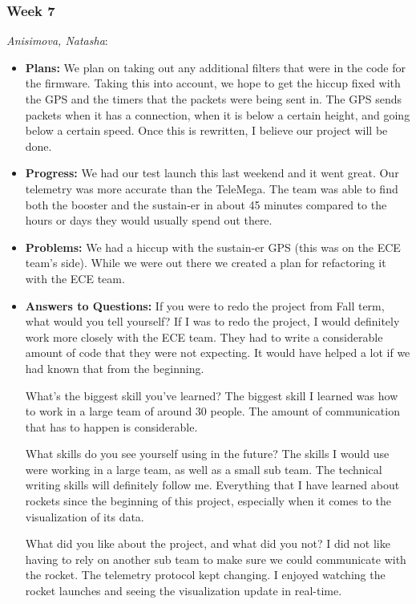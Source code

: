 \documentclass[10pt,draftclsnofoot,onecolumn]{IEEEtran}
\newcommand{\subsubsubsection}[1]{
	\hfill\break\textit{#1}:
}
\begin{document}
\subsubsection{Week 7}
\subsubsubsection{Anisimova, Natasha}
\begin{itemize}
	\item \textbf{Plans: }
We plan on taking out any additional filters that were in the code for the firmware. Taking this into account, we hope to get the hiccup fixed with the GPS and the timers that the packets were being sent in. The GPS sends packets when it has a connection, when it is below a certain height, and going below a certain speed. Once this is rewritten, I believe our project will be done.
	\item \textbf{Progress:  }
We had our test launch this last weekend and it went great. Our telemetry was more accurate than the TeleMega. The team was able to find both the booster and the sustain-er in about 45 minutes compared to the hours or days they would usually spend out there.
	\item \textbf{Problems: }
	We had a hiccup with the sustain-er GPS (this was on the ECE team's side). While we were out there we created a plan for refactoring it with the ECE team.
	\item\textbf{Answers to Questions: }
	If you were to redo the project from Fall term, what would you tell yourself? If I was to redo the project, I would definitely work more closely with the ECE team. They had to write a considerable amount of code that they were not expecting. It would have helped a lot if we had known that from the beginning.

	What's the biggest skill you've learned? The biggest skill I learned was how to work in a large team of around 30 people. The amount of communication that has to happen is considerable.

	What skills do you see yourself using in the future? The skills I would use were working in a large team, as well as a small sub team. The technical writing skills will definitely follow me. Everything that I have learned about rockets since the beginning of this project, especially when it comes to the visualization of its data.

	What did you like about the project, and what did you not? I did not like having to rely on another sub team to make sure we could communicate with the rocket. The telemetry protocol kept changing. I enjoyed watching the rocket launches and seeing the visualization update in real-time.


\end{itemize}
\end{document}
